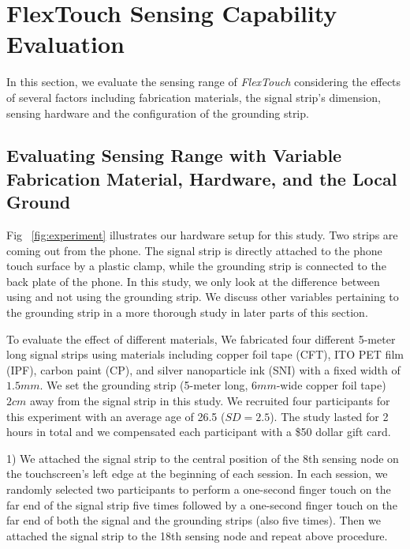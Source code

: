 \chapter{FlexTouch Sensing Capability Evaluation}
In this section, we evaluate the sensing range of \textit{FlexTouch} considering the effects of several factors including fabrication materials, the signal strip's dimension, sensing hardware and the configuration of the grounding strip.

\section{Evaluating Sensing Range with Variable Fabrication Material, Hardware, and the Local Ground}

Fig ~\ref{fig:experiment} illustrates our hardware setup for this study. Two strips are coming out from the phone. The signal strip is directly attached to the phone touch surface by a plastic clamp, while the grounding strip is connected to the back plate of the phone. In this study, we only look at the difference between using and not using the grounding strip. We discuss other variables pertaining to the  grounding strip in a more thorough study in later parts of this section. 

	
To evaluate the effect of different materials, We fabricated four different 5-meter long signal strips using materials including copper foil tape (CFT), ITO PET film (IPF), carbon paint (CP), and silver nanoparticle ink (SNI) with a fixed width of $1.5mm$. We set the grounding strip (5-meter long, $6mm$-wide copper foil tape) $2 cm$ away from the signal strip in this study. We recruited four participants for this experiment with an average age of 26.5 ($SD = 2.5$). The study lasted for 2 hours in total and we compensated each participant with a \$50 dollar gift card.

1) We attached the signal strip to the central position of the 8th sensing node on the touchscreen's left edge at the beginning of each session. In each session, we randomly selected two participants to perform a one-second finger touch on the far end of the signal strip five times followed by a one-second finger touch on the far end of both the signal and the grounding strips (also five times). Then we attached the signal strip to the 18th sensing node and repeat above procedure. 

